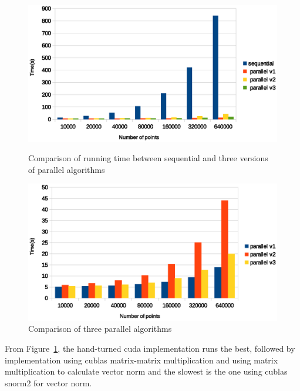 \begin{figure}[!h]
  \centering
  \begin{minipage}{.8\textwidth}
    \includegraphics[width=\linewidth]{fig/all_comparison}
    \caption{Comparison of running time between sequential and three versions of parallel algorithms}
    \label{fig:all}
  \end{minipage}
  \begin{minipage}{.8\textwidth}
    \includegraphics[width=\linewidth]{fig/parallel_algorithm_comparison}
    \caption{Comparison of three parallel algorithms}
    \label{fig:par}
  \end{minipage}
\end{figure}

From Figure~\ref{fig:par}, the hand-turned cuda implementation runs the best, followed by implementation
using cublas matrix-matrix multiplication and using matrix multiplication to calculate vector norm
and the slowest is the one using cublas snorm2 for vector norm. 
